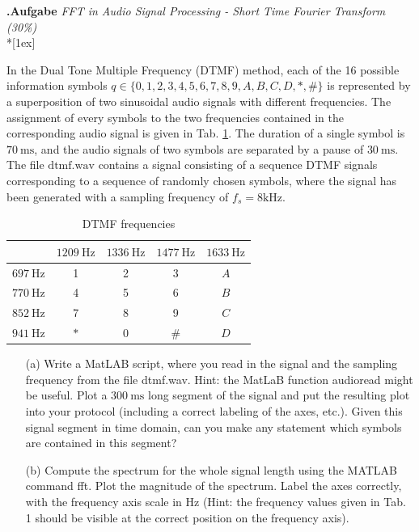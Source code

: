 \documentclass[12pt,a4paper,austrian]{article}
\newcounter{theaufgabe}\setcounter{theaufgabe}{1}
\newenvironment{aufgabe}[1]%
{\bigskip\par\noindent\begin{nopagebreak}
                          \textsf{\textbf{\arabic{theaufgabe}.\thinspace Aufgabe}}\quad
                          \textsf{\textit{#1}}\\*[1ex]%
                          \stepcounter{theaufgabe}\hspace{2ex}
\end{nopagebreak}}
{\par\pagebreak[2]}
\begin{document}
    \begin{aufgabe}{FFT in Audio Signal Processing - Short Time Fourier Transform (30\%)}
        In the Dual Tone Multiple Frequency (DTMF) method, each of the 16 possible information symbols $q \in\{0,1,2,3,4,5,6,7,8,9, A, B, C, D, *, \#\}$ is represented by a superposition of two sinusoidal audio signals with different frequencies.
        The assignment of every symbols to the two frequencies contained in the corresponding audio signal is given in Tab. \ref{tab:ex4_frequencies}.
        The duration of a single symbol is $70 \mathrm{~ms}$, and the audio signals of two symbols are separated by a pause of $30 \mathrm{~ms}$.
        The file $\mathrm{dtmf.wav}$ contains a signal consisting of a sequence DTMF signals corresponding to a sequence of randomly chosen symbols, where the signal has been generated with a sampling frequency of $f_{s}=8 \mathrm{kHz}$.

        \begin{table}
            \caption{DTMF frequencies}
            \label{tab:ex4_frequencies}
            \centering
            \begin{tabular}{|c|c|c|c|c|}
                \hline
                & $1209 \mathrm{~Hz}$ & $1336 \mathrm{~Hz}$ & $1477 \mathrm{~Hz}$ & $1633 \mathrm{~Hz}$ \\
                \hline
                $697 \mathrm{~Hz}$ & 1                   & 2                   & 3                   & $A$                 \\
                \hline
                $770 \mathrm{~Hz}$ & 4                   & 5                   & 6                   & $B$                 \\
                \hline
                $852 \mathrm{~Hz}$ & 7                   & 8                   & 9                   & $C$                 \\
                \hline
                $941 \mathrm{~Hz}$ & $*$                 & 0                   & $\#$                & $D$                 \\
                \hline
            \end{tabular}
        \end{table}


        \begin{enumerate}
            \item[(a)] Write a MatLAB script, where you read in the signal and the sampling frequency from the file dtmf.wav. Hint: the MatLaB function audioread might be useful. Plot a $300 \mathrm{~ms}$ long segment of the signal and put the resulting plot into your protocol (including a correct labeling of the axes, etc.). Given this signal segment in time domain, can you make any statement which symbols are contained in this segment?
            \item[(b)] Compute the spectrum for the whole signal length using the MATLAB command fft.
            Plot the magnitude of the spectrum.
            Label the axes correctly, with the frequency axis scale in $\mathrm{Hz}$ (Hint: the frequency values given in Tab. 1 should be visible at the correct position on the frequency axis).


\end{enumerate}
\end{aufgabe}
\end{document}
